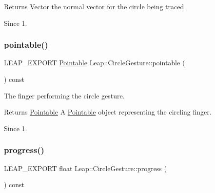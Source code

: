 \begin{DoxyReturn}{Returns}
\hyperlink{struct_leap_1_1_vector}{Vector} the normal vector for the circle being traced 
\end{DoxyReturn}
\begin{DoxySince}{Since}
1. 
\end{DoxySince}
\mbox{\label{class_leap_1_1_circle_gesture_aedf367c1c2750043dfbc02612a2bd7d7}} 
\subsubsection{\texorpdfstring{pointable()}{pointable()}}
{\footnotesize\ttfamily L\+E\+A\+P\+\_\+\+E\+X\+P\+O\+RT \hyperlink{class_leap_1_1_pointable}{Pointable} Leap\+::\+Circle\+Gesture\+::pointable (\begin{DoxyParamCaption}{ }\end{DoxyParamCaption}) const}

The finger performing the circle gesture.


\begin{DoxyCodeInclude}
\end{DoxyCodeInclude}


\begin{DoxyReturn}{Returns}
\hyperlink{class_leap_1_1_pointable}{Pointable} A \hyperlink{class_leap_1_1_pointable}{Pointable} object representing the circling finger. 
\end{DoxyReturn}
\begin{DoxySince}{Since}
1. 
\end{DoxySince}
\mbox{\label{class_leap_1_1_circle_gesture_ab7e8c9e8e22bfa699454a1a117410706}} 
\subsubsection{\texorpdfstring{progress()}{progress()}}
{\footnotesize\ttfamily L\+E\+A\+P\+\_\+\+E\+X\+P\+O\+RT float Leap\+::\+Circle\+Gesture\+::progress (\begin{DoxyParamCaption}{ }\end{DoxyParamCaption}) const}

